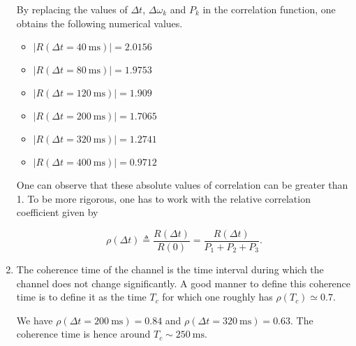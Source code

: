 \documentclass [a4paper, 11pt] {article}
\begin{document}
\begin{solution}
\begin{enumerate}
        By replacing the values of $\Delta t$, $\Delta \omega_k$ and $P_k$ in the correlation function, one obtains the following numerical values. 
        
        \medskip
        
        \begin{minipage}{0.45\textwidth}
                \begin{itemize}
                \item[] $|R(\Delta t = \SI{40}{\milli\second})| = 2.0156$
                \item[] $|R(\Delta t = \SI{80}{\milli\second})| = 1.9753$
                \item[] $|R(\Delta t = \SI{120}{\milli\second})| = 1.909$
        
            \end{itemize}
            \end{minipage}
            \hfill
            \begin{minipage}{0.45\textwidth}
                \begin{itemize}
                \item[] $|R(\Delta t = \SI{200}{\milli\second})| = 1.7065$
                \item[] $|R(\Delta t = \SI{320}{\milli\second})| = 1.2741$
                \item[] $|R(\Delta t = \SI{400}{\milli\second})| = 0.9712$
            \end{itemize}
            \end{minipage}
        
        \medskip
        
        One can observe that these absolute values of correlation can be greater than 1. To be more rigorous, one has to work with the relative correlation coefficient given by 
        
        \begin{equation}
             \rho(\Delta t) \triangleq \dfrac{R(\Delta t)}{R(0)} = \dfrac{R(\Delta t)}{P_1 + P_2 + P_3}.
        \end{equation}
        \item The coherence time of the channel is the time interval during which the channel does not change significantly. A good manner to define this coherence time is to define it as the time $T_c$ for which one roughly has $\rho(T_c) \simeq 0.7$. 
        
        We have $\rho(\Delta t = \SI{200}{\milli\second}) = 0.84$ and $\rho(\Delta t = \SI{320}{\milli\second}) = 0.63$. The coherence time is hence around $T_c \sim \SI{250}{\milli\second}$.
        

\end{enumerate}
\end{solution}
\end{document}
